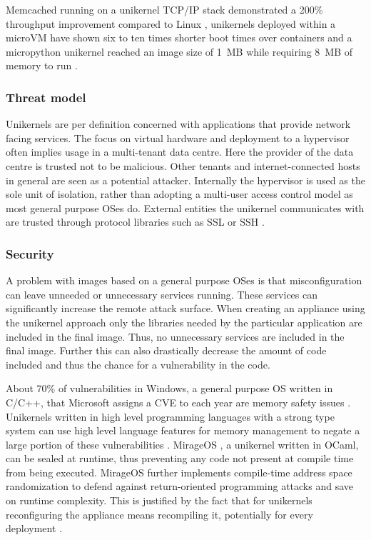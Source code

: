 \documentclass[10pt,twocolumn,a4paper]{article}
\begin{document}
      Memcached running on a unikernel TCP/IP stack
      demonstrated a 200\% throughput improvement compared to Linux \cite{schatzberg16},
      unikernels deployed within a microVM have shown six to ten times shorter
      boot times over containers \cite{koller17} and a micropython unikernel reached an image
      size of 1~MB while requiring 8~MB of memory to run \cite{manco17}.

    \subsubsection{Threat model}\label{sec:thread-model}
      Unikernels are per definition concerned with applications that provide network
      facing services. 
      The focus on virtual hardware and deployment to a hypervisor
      often implies usage in a multi-tenant data centre.
      Here the provider of the data centre is trusted not to be malicious.
      Other tenants and internet-connected hosts in general are seen as 
      a potential attacker.
      Internally the hypervisor is used as the sole unit of isolation, 
      rather than adopting a multi-user access control model as most general purpose OSes do.
      External entities the unikernel communicates with are trusted through
      protocol libraries such as SSL or SSH \cite{madhavapeddy13}.

    \subsubsection{Security}
      A problem with images based on a general purpose OSes is that misconfiguration can
      leave unneeded or unnecessary services running. 
      These services can significantly increase the remote attack surface.
      When creating an appliance using the unikernel approach only the libraries
      needed by the particular application are included in the final image.
      Thus, no unnecessary services are included in the final image.
      Further this can also drastically decrease the amount of code included and thus the chance
      for a vulnerability in the code.
      
      About 70\% of vulnerabilities in Windows, a general purpose OS written in C/C++,
      that Microsoft assigns a CVE to each year are memory safety issues \cite{msrc-19-07}.
      Unikernels written in high level programming languages with a strong type system 
      can use high level language features for memory management to negate a large
      portion of these vulnerabilities \cite{madhavapeddy13, lankes19}.
      MirageOS \cite{madhavapeddy13}, a unikernel written in OCaml, can be sealed \cite{hunt07} at runtime,
      thus preventing any code not present at compile time from being executed.
      MirageOS further implements compile-time address space randomization to defend against
      return-oriented programming attacks and save on runtime complexity.
      This is justified by the fact that for unikernels reconfiguring the appliance 
      means recompiling it, potentially for every deployment \cite{madhavapeddy13}.
\end{document}
